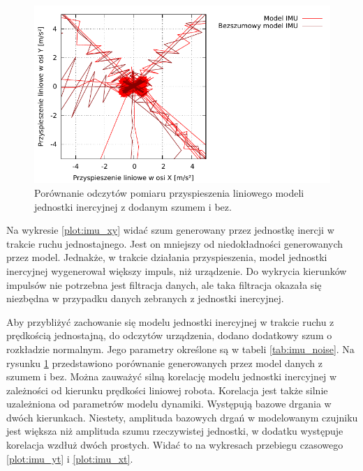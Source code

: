 		\begin{figure}[H]
			\centering
			\includegraphics[width=\textwidth]{plots/imu_xy_n.pdf}
				\caption{Porównanie odczytów pomiaru przyspieszenia liniowego modeli jednostki inercyjnej z dodanym szumem i bez.}
			\label{plot:imu_xy_n}
		\end{figure}
		
		Na wykresie \ref{plot:imu_xy} widać szum generowany przez jednostkę inercji w trakcie ruchu jednostajnego. Jest on mniejszy od niedokładności generowanych
		przez model. Jednakże, w trakcie działania przyspieszenia, model jednostki inercyjnej wygenerował większy impuls, niż urządzenie.
		Do wykrycia kierunków impulsów nie potrzebna jest filtracja danych, ale taka filtracja okazała się niezbędna w przypadku danych zebranych z jednostki inercyjnej.
		
		Aby przybliżyć zachowanie się modelu jednostki inercyjnej w trakcie ruchu z prędkością jednostajną, do odczytów urządzenia, dodano dodatkowy szum o rozkładzie normalnym.
		Jego parametry określone są w tabeli \ref{tab:imu_noise}.
		Na rysunku \ref{plot:imu_xy_n} przedstawiono porównanie generowanych przez model danych z szumem i bez.
		Można zauważyć silną korelację modelu jednostki inercyjnej w zależności od kierunku prędkości liniowej robota. 
		Korelacja jest także silnie uzależniona od parametrów modelu dynamiki. Występują bazowe drgania w dwóch kierunkach.
		Niestety, amplituda bazowych drgań w modelowanym czujniku jest większa niż amplituda szumu rzeczywistej jednostki, w dodatku występuje korelacja wzdłuż dwóch prostych.
		Widać to na wykresach przebiegu czasowego \ref{plot:imu_yt} i \ref{plot:imu_xt}.
		
